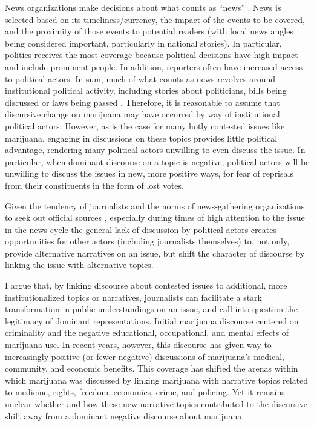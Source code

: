 News organizations make decisions about what counts as ``news'' \citep{galtung_and_ruge_1965}. News is selected based on its timeliness/currency, the impact of the events to be covered, and the proximity of those events to potential readers (with local news angles being considered important, particularly in national stories). In particular, politics receives the most coverage because political decisions have high impact and include prominent people. In addition, reporters often have increased access to political actors. In sum, much of what counts as news revolves around institutional political activity, including stories about politicians, bills being discussed or laws being passed \citep{amenta_et_al_2012}. Therefore, it is reasonable to assume that discursive change on marijuana may have occurred by way of institutional political actors. However, as is the case for many hotly contested issues like marijuana, engaging in discussions on these topics provides little political advantage, rendering many political actors unwilling to even discuss the issue. In particular, when dominant discourse on a topic is negative, political actors will be unwilling to discuss the issues in new, more positive ways, for fear of reprisals from their constituents in the form of lost votes. 

Given the tendency of journalists and the norms of news-gathering organizations to seek out official sources \citep{schudson_2002,gitlin_1980,gans_1979}, especially during times of high attention to the issue in the news cycle \citep{baumgartner_and_jones_1993} the general lack of discussion by political actors creates opportunities for other actors (including journalists themselves) to, not only, provide alternative narratives on an issue, but shift the character of discourse by linking the issue with alternative topics. 



I argue that, by linking discourse about contested issues to additional, more institutionalized topics or narratives, journalists can facilitate a stark transformation in public understandings on an issue, and call into question the legitimacy of dominant representations. Initial marijuana discourse centered on criminality and the negative educational, occupational, and mental effects of marijuana use. In recent years, however, this discourse has given way to increasingly positive (or fewer negative) discussions of marijuana's medical, community, and economic benefits. This coverage has shifted the arenas within which marijuana was discussed by linking marijuana with narrative topics related to medicine, rights, freedom, economics, crime, and policing. Yet it remains unclear whether and how these new narrative topics contributed to the discursive shift away from a dominant negative discourse about marijuana. 

